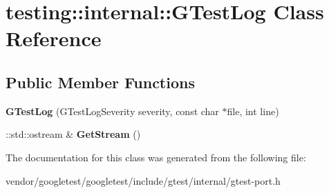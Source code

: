 \hypertarget{classtesting_1_1internal_1_1GTestLog}{}\section{testing\+:\+:internal\+:\+:G\+Test\+Log Class Reference}
\label{classtesting_1_1internal_1_1GTestLog}
\subsection*{Public Member Functions}
\begin{DoxyCompactItemize}
\item 
{\bfseries G\+Test\+Log} (G\+Test\+Log\+Severity severity, const char $\ast$file, int line)\hypertarget{classtesting_1_1internal_1_1GTestLog_a364691bf972983a59cfa2891062a64af}{}\label{classtesting_1_1internal_1_1GTestLog_a364691bf972983a59cfa2891062a64af}

\item 
\+::std\+::ostream \& {\bfseries Get\+Stream} ()\hypertarget{classtesting_1_1internal_1_1GTestLog_aebb92e67d98eca69f0347d5121dab27a}{}\label{classtesting_1_1internal_1_1GTestLog_aebb92e67d98eca69f0347d5121dab27a}

\end{DoxyCompactItemize}


The documentation for this class was generated from the following file\+:\begin{DoxyCompactItemize}
\item 
vendor/googletest/googletest/include/gtest/internal/gtest-\/port.\+h\end{DoxyCompactItemize}

